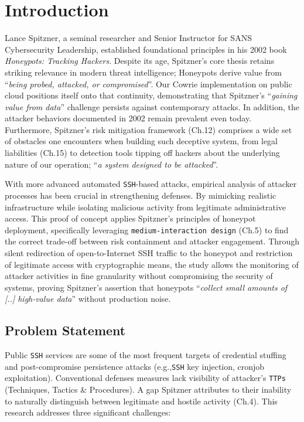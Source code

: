 \documentclass{cls/ULBreport}
\begin{document}
    \section{Introduction}

    Lance Spitzner, a seminal researcher and Senior Instructor for SANS Cybersecurity Leadership, established foundational principles in his 2002 book \textit{Honeypots: Tracking Hackers}. 
    Despite its age, Spitzner's core thesis retains striking relevance in modern threat intelligence; Honeypots derive value from \enquote{\textit{being probed, attacked, or compromised}}\autocite[Ch.~1, p.~23]{spitzner2002honeypots}. Our Cowrie implementation on public cloud positions itself onto that continuity, demonstrating that Spitzner's \enquote{\textit{gaining value from data}} challenge \autocite[Ch.~4, p.~67]{spitzner2002honeypots} persists against contemporary attacks. In addition, the attacker behaviors documented in 2002 remain prevalent even today. Furthermore, Spitzner's risk mitigation framework (Ch.12) comprises a wide set of obstacles one encounters when building such deceptive system, from legal liabilities (Ch.15) to detection tools tipping off hackers about the underlying nature of our operation; \enquote{\textit{a system designed to be attacked}}\autocite[Ch.~12, p.~298]{spitzner2002honeypots}. 
    
    
    With more advanced automated \texttt{SSH}-based attacks, empirical analysis of attacker processes has been crucial in strengthening defenses. By mimicking realistic infrastructure while isolating malicious activity from legitimate administrative access. This proof of concept applies Spitzner's principles of honeypot deployment, specifically leveraging \texttt{medium-interaction design} (Ch.5) to find the correct trade-off between risk containment and attacker engagement. Through silent redirection of open-to-Internet SSH traffic to the honeypot and restriction of legitimate access with cryptographic means, the study allows the monitoring of attacker activities in fine granularity without compromising the security of systems, proving Spitzner's assertion that honeypots \enquote{\textit{collect small amounts of [..] high-value data}} \autocite[Ch.~4, p.~68]{spitzner2002honeypots} without production noise.  

        \subsection{Problem Statement} 
        Public \texttt{SSH} services are some of the most frequent targets of credential stuffing and post-compromise persistence attacks (e.g.,\texttt{SSH} key injection, cronjob exploitation). Conventional defenses measures lack visibility of attacker's \texttt{TTPs} (Techniques, Tactics \& Procedures). A gap Spitzner attributes to their inability to naturally distinguish between legitimate and hostile activity (Ch.4). This research addresses three significant challenges: 
            
\end{document}
